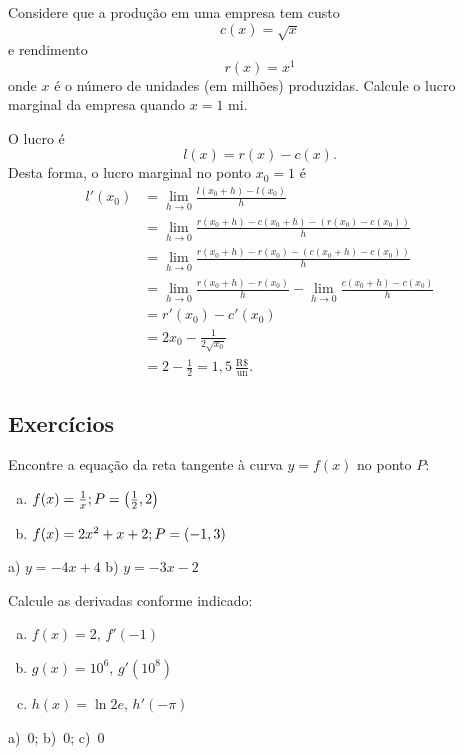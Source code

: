 \cleardoublepage\documentclass[../main.tex]{subfiles}
\begin{document}
\begin{exeresol}
  Considere que a produção em uma empresa tem custo
  \begin{equation*}
    c(x) = \sqrt{x}
  \end{equation*}
  e rendimento
  \begin{equation*}
    r(x) = x^1
  \end{equation*}
  onde $x$ é o número de unidades (em milhões) produzidas. Calcule o lucro marginal da empresa quando $x=1$ mi.
\end{exeresol}
\begin{resol}
  O lucro é
  \begin{equation*}
    l(x) = r(x) - c(x).
  \end{equation*}
  Desta forma, o lucro marginal no ponto $x_0=1$ é
  \begin{align*}
    l'(x_0) &= \lim_{h\to 0} \frac{l(x_0+h)-l(x_0)}{h}\\
            &= \lim_{h\to 0} \frac{r(x_0+h)-c(x_0+h)-(r(x_0)-c(x_0))}{h}\\
            &= \lim_{h\to 0} \frac{r(x_0+h)-r(x_0) - (c(x_0+h)-c(x_0))}{h}\\
            &= \lim_{h\to 0} \frac{r(x_0+h)-r(x_0)}{h} - \lim_{h\to 0} \frac{c(x_0+h)-c(x_0)}{h}\\
            &= r'(x_0) - c'(x_0)\\
            &= 2x_0 - \frac{1}{2\sqrt{x_0}}\\
            &= 2 - \frac{1}{2} = 1,5~\frac{\text{R\$}}{\text{un}}.
  \end{align*}
\end{resol}


\subsection{Exercícios}
\begin{exer}
  Encontre a equação da reta tangente à curva $y= f(x)$ no ponto $P$:
   \begin{enumerate}[a)]
  \item  $f(x)=\frac{1}{x}; P=\left(\frac{1}{2},2\right)$
  \item  $f(x)=2x^2+x+2; P=\left(-1,3\right)$
  \end{enumerate}
\end{exer}
\begin{resp}
 a) $y = -4x + 4$\hspace{2cm} b) $y = -3x - 2$
\end{resp}
\begin{exer}
  Calcule as derivadas conforme indicado:
  \begin{enumerate}[a)]
  \item $f(x) = 2$, $f'(-1)$
  \item $g(x) = 10^6$, $g'(10^8)$
  \item $h(x) = \ln 2e$, $h'(-\pi)$
  \end{enumerate}
\end{exer}
\begin{resp}
  a)~$0$; b)~$0$; c)~$0$
\end{resp}
\end{document}
